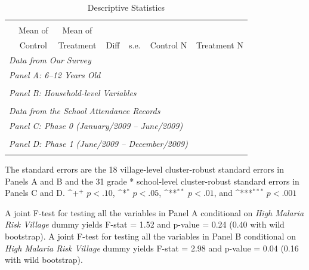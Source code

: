 \documentclass[fleqn,11pt]{article}
\newcommand{\sym}[1]{\rlap{$#1$}}
\def\sym#1{\ifmmode^{#1}\else\(^{#1}\)\fi
}
\begin{document}
\begin{table}[h]
\caption{Descriptive Statistics}

\begin{adjustbox}{max width=\textwidth}
\begin{threeparttable}
\label{descriptive_merge_child}\centering
\begin{tabular}{l*{1}{cccccc}}
\hline\hline\\
		&Mean of& Mean of&&&&\\
	&   Control&    Treatment&        Diff&        s.e.& Control N&  Treatment N\\
              \multicolumn{6}{l}{\it Data from Our Survey}        \\ \hline
              \multicolumn{6}{l}{\it Panel A:  6--12 Years Old}        \\

\hline 
 \\
\multicolumn{6}{l}{{\it Panel B: Household-level Variables}} \\
\hline  \\
              \multicolumn{6}{l}{\it Data from the School Attendance Records}        \\ 
\hline
              \multicolumn{6}{l}{\it Panel C: Phase 0 (January/2009 -- June/2009)}   \\
              \hline
               \\
              \multicolumn{6}{l}{\it Panel D: Phase 1 (June/2009 -- December/2009)}   \\
              \hline
               \\ \hline \hline
\end{tabular}
\begin{tablenotes}
\item The standard errors are the 18 village-level cluster-robust standard errors in Panels A and B and the 31 grade * school-level cluster-robust standard errors in Panels C and D.  \sym{+} \(p<.10\), \sym{*} \(p<.05\), \sym{**} \(p<.01\), and \sym{***} \(p<.001\)
\item A joint F-test for testing all the variables in Panel A conditional on \textit{High Malaria Risk Village} dummy yields F-stat = 1.52 and p-value = 0.24 (0.40 with wild bootstrap). A joint F-test for testing all the variables in Panel B conditional on \textit{High Malaria Risk Village} dummy yields F-stat = 2.98 and p-value = 0.04 (0.16 with wild bootstrap).  
\end{tablenotes}
\end{threeparttable}
\end{adjustbox}
\end{table}
\end{document}
